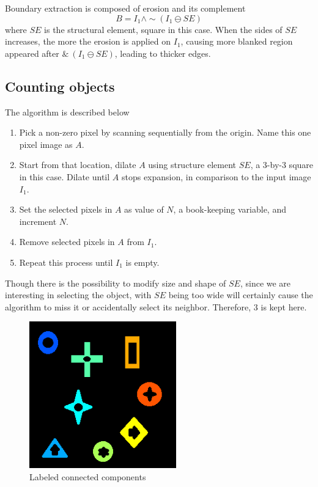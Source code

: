 \documentclass[12pt]{article}
\begin{document}
Boundary extraction is composed of erosion and its complement
\begin{equation}
	B = I_1 \wedge \sim (I_1 \ominus SE)
\end{equation}
where $SE$ is the structural element, square in this case.
When the sides of $SE$ increases, the more the erosion is applied on $I_1$, causing more blanked region appeared after $\& ~(I_1 \ominus SE)$, leading to thicker edges.

\subsection*{Counting objects}
The algorithm is described below 
\begin{enumerate}
\item 
Pick a non-zero pixel by scanning sequentially from the origin. Name this one pixel image as $A$. 

\item
Start from that location, dilate $A$ using structure element $SE$, a 3-by-3 square in this case.
Dilate until $A$ stops expansion, in comparison to the input image $I_1$.

\item 
Set the selected pixels in $A$ as value of $N$, a book-keeping variable, and increment $N$.

\item
Remove selected pixels in $A$ from $I_1$.

\item
Repeat this process until $I_1$ is empty.
\end{enumerate}
Though there is the possibility to modify size and shape of $SE$, since we are interesting in selecting the object, with $SE$ being too wide will certainly cause the algorithm to miss it or accidentally select its neighbor. Therefore, 3 is kept here.

\begin{figure}[H]
    \centering
    \includegraphics[height=2.5in]{images/L}
    \caption{Labeled connected components}
\end{figure}
\end{document}
